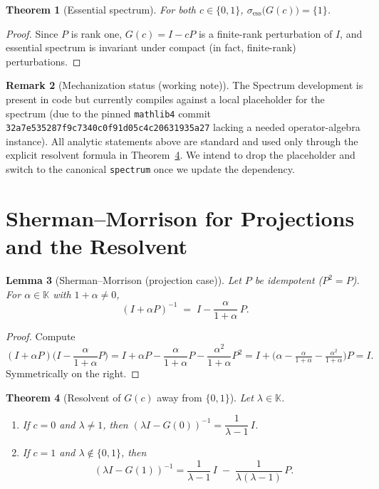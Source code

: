 \documentclass[11pt]{article}
\newtheorem{theorem}{Theorem}[section]
\newtheorem{lemma}[theorem]{Lemma}
\theoremstyle{definition}
\newtheorem{remark}[theorem]{Remark}
\newcommand{\K}{\mathbb{K}}
\begin{document}
\begin{theorem}[Essential spectrum]\label{thm:ess}
For both $c\in\{0,1\}$, $\sigma_{\mathrm{ess}}\big(G(c)\big)=\{1\}$.
\end{theorem}

\begin{proof}
Since $P$ is rank one, $G(c)=I-cP$ is a finite-rank perturbation of $I$, and essential spectrum is invariant under compact (in fact, finite-rank) perturbations.
\end{proof}

\begin{remark}[Mechanization status (working note)]  %
The Spectrum development is present in code but currently compiles against a local placeholder for the spectrum (due to the pinned \texttt{mathlib4} commit \texttt{32a7e535287f9c7340c0f91d05c4c20631935a27} lacking a needed operator-algebra instance). All analytic statements above are standard and used only through the explicit resolvent formula in Theorem~\ref{thm:SM-resolvent}. We intend to drop the placeholder and switch to the canonical \texttt{spectrum} once we update the dependency.
\end{remark}

\section{Sherman--Morrison for Projections and the Resolvent}\label{sec:SM}

\begin{lemma}[Sherman--Morrison (projection case)]\label{lem:SM}
Let $P$ be idempotent ($P^2=P$). For $\alpha\in\K$ with $1+\alpha\neq 0$,
\[
(I+\alpha P)^{-1} \;=\; I - \frac{\alpha}{1+\alpha}\,P.
\]
\end{lemma}

\begin{proof}
Compute
\[
(I+\alpha P)\Big(I - \frac{\alpha}{1+\alpha}P\Big)
= I + \alpha P - \frac{\alpha}{1+\alpha}P - \frac{\alpha^2}{1+\alpha}P^2
= I + \Big(\alpha - \tfrac{\alpha}{1+\alpha} - \tfrac{\alpha^2}{1+\alpha}\Big)P = I.
\]
Symmetrically on the right.
\end{proof}

\begin{theorem}[Resolvent of $G(c)$ away from $\{0,1\}$]\label{thm:SM-resolvent}
Let $\lambda\in\K$.
\begin{enumerate}
\item If $c=0$ and $\lambda\neq 1$, then $(\lambda I - G(0))^{-1}=\dfrac{1}{\lambda-1}\,I$.
\item If $c=1$ and $\lambda\notin\{0,1\}$, then
\[
(\lambda I - G(1))^{-1}
= \frac{1}{\lambda-1}\,I \;-\; \frac{1}{\lambda(\lambda-1)}\,P.
\]
\end{enumerate}
\end{theorem}
\end{document}
